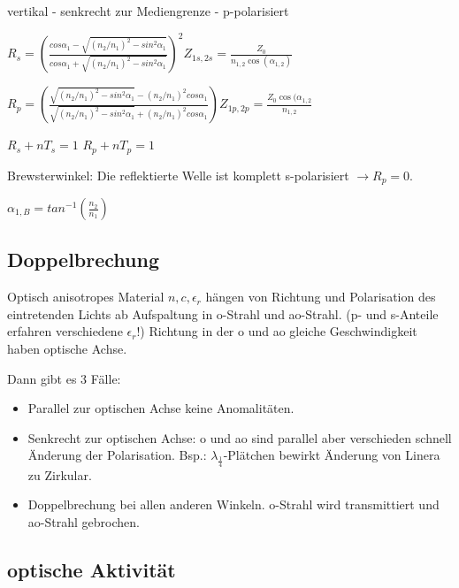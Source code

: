 \documentclass[10pt,a4paper]{scrartcl}
\begin{document}
\begin{multicols*}{3}
	vertikal - senkrecht zur Mediengrenze - p-polarisiert
	
	\vspace{1ex}	
	
	$R_s=\left(\frac{cos\alpha_1-\sqrt{(n_2/n_1)^2-sin^2\alpha_1}}{cos\alpha_1+\sqrt{(n_2/n_1)^2-sin^2\alpha_1}}\right)^2$\hfill$Z_{1s,2s}=\frac{Z_0}{n_{1,2}\cos(\alpha_{1,2})}$
	
	$R_p=\left(\frac{\sqrt{(n_2/n_1)^2-sin^2\alpha_1}-(n_2/n_1)^2cos\alpha_1}{\sqrt{(n_2/n_1)^2-sin^2\alpha_1}+(n_2/n_1)^2cos\alpha_1}\right)$\hfill$Z_{1p,2p}=\frac{Z_0\cos(\alpha_{1,2}}{n_{1,2}}$
	
	
	\vspace{1ex}	
	
	$R_s+nT_s=1$ \hfill $R_p+nT_p=1$
	
	Brewsterwinkel: Die reflektierte Welle ist komplett s-polarisiert $\rightarrow R_p = 0$.
	
	$\alpha_{1,B}=tan^{-1}(\frac{n_2}{n_1})$
	
	\subsection{Doppelbrechung}
	
	Optisch anisotropes Material \dahe $n,c,\epsilon_r$ hängen von Richtung und Polarisation des eintretenden Lichts ab \dahe Aufspaltung in o-Strahl und ao-Strahl. (p- und s-Anteile erfahren verschiedene $\epsilon_r$!) Richtung in der o und ao gleiche Geschwindigkeit haben \dahe optische Achse.
	
	
	Dann gibt es 3 Fälle:
	
	\begin{itemize}
	\compaq
	\item
	Parallel zur optischen Achse keine Anomalitäten.
	\item
	Senkrecht zur optischen Achse: o und ao sind parallel aber verschieden schnell \dahe Änderung der Polarisation. Bsp.: $\lambda_{\frac{1}{4}}$-Plätchen bewirkt Änderung von Linera zu Zirkular.
	\item
	Doppelbrechung bei allen anderen Winkeln. o-Strahl wird transmittiert und ao-Strahl gebrochen.
	\end{itemize}
	
	
	\subsection{optische Aktivität}
	

\end{multicols*}
\end{document}
